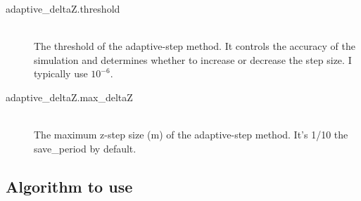 \documentclass[12pt,hidelinks]{book}
\begin{document}
\begin{description}
\item[adaptive\_deltaZ.threshold]\mbox{}\\
The threshold of the adaptive-step method. It controls the accuracy of the simulation and determines whether to increase or decrease the step size. I typically use $10^{-6}$.

\item[adaptive\_deltaZ.max\_deltaZ]\mbox{}\\
The maximum z-step size (\si{m}) of the adaptive-step method. It's 1/10 the save\_period by default.
\end{description}

\subsection{Algorithm to use}
\end{document}
